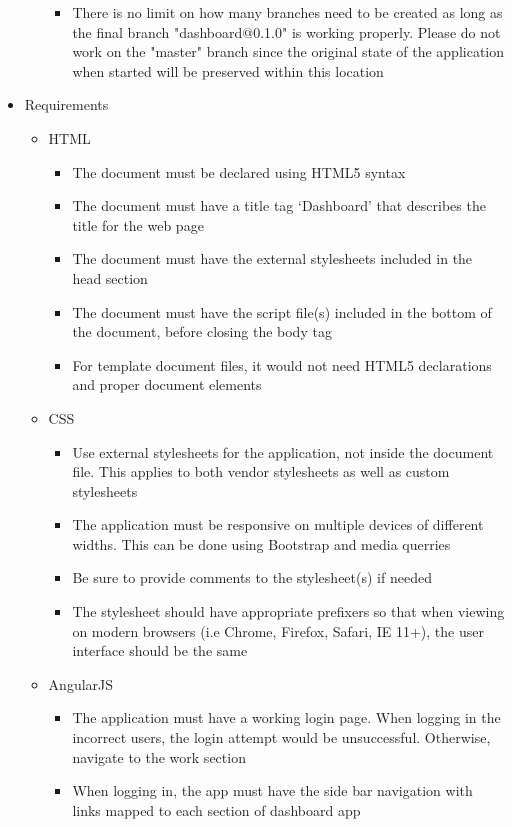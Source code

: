\documentclass[12pt]{article}
\begin{document}
\begin{itemize}
\begin{itemize}
\begin{itemize}
		\item There is no limit on how many branches need to be created as long as the final branch "dashboard@0.1.0" is working properly. Please do not work on the "master" branch since the original state of the application when started will be preserved within this location
		\end{itemize}
	\end{itemize}
	\item Requirements	
		\begin{itemize}
		\item HTML
			\begin{itemize}
				\item The document must be declared using HTML5 syntax
				\item The document must have a title tag `Dashboard' that describes the title for the web page
				\item The document must have the external stylesheets included in the head section
				\item The document must have the script file(s) included in the bottom of the document, before closing the body tag
				\item For template document files, it would not need HTML5 declarations and proper document elements
			\end{itemize}
		\item CSS
			\begin{itemize}
				\item Use external stylesheets for the application, not inside the document file. This applies to both vendor stylesheets as well as custom stylesheets
				\item The application must be responsive on multiple devices of different widths. This can be done using Bootstrap and media querries
				\item Be sure to provide comments to the stylesheet(s) if needed
				\item The stylesheet should have appropriate prefixers so that when viewing on modern browsers (i.e Chrome, Firefox, Safari, IE 11+), the user interface should be the same
			\end{itemize}
		\item AngularJS
			\begin{itemize}
				\item The application must have a working login page. When logging in the incorrect users, the login attempt would be unsuccessful. Otherwise, navigate to the work section
				\item When logging in, the app must have the side bar navigation with links mapped to each section of dashboard app

\end{itemize}
\end{itemize}
\end{itemize}
\end{document}

